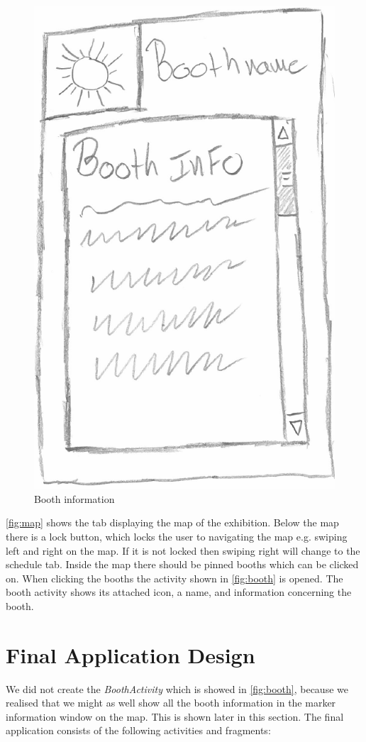 \begin{figure}[H]
\begin{minipage}[b]{0.5\columnwidth}
\includegraphics[width=0.7\columnwidth]{img/prototype/8.png}
\caption{Booth information\label{fig:booth}}
\end{minipage}
\end{figure}

\autoref{fig:map} shows the tab displaying the map of the exhibition. Below the map there is a lock button, which locks the user to navigating the map e.g. swiping left and right on the map. If it is not locked then swiping right will change to the schedule tab. Inside the map there should be pinned booths which can be clicked on. When clicking the booths the activity shown in \autoref{fig:booth} is opened. The booth activity shows its attached icon, a name, and information concerning the booth.

\section{Final Application Design}

We did not create the \textit{BoothActivity} which is showed in \autoref{fig:booth}, because we realised that we might as well show all the booth information in the marker information window on the map. This is shown later in this section. The final application consists of the following activities and fragments:

